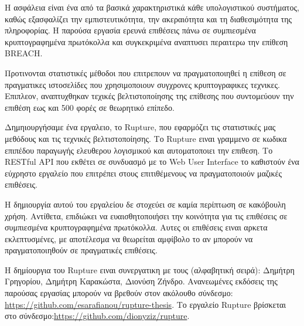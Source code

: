 \begin{abstractgr}

Η ασφάλεια είναι ένα από τα βασικά χαρακτηριστικά κάθε υπολογιστικού
συστήματος, καθώς εξασφαλίζει την εμπιστευτικότητα, την ακεραιότητα και τη διαθεσιμότητα
της πληροφορίας. Η παρούσα εργασία ερευνά επιθέσεις πάνω σε συμπιεσμένα
κρυπτογραφημένα πρωτόκολλα και συγκεκριμένα αναπτυσει περαιτερω την επίθεση BREACH.

Προτινονται στατιστικές μέθοδοι που επιτρεπουν να πραγματοποιηθεί
η επίθεση σε πραγματικες ιστοσελίδες που χρησιμοποιουν συγχρονες κρυπτογραφικες
τεχνικες. Επιπλεον, αναπτυχθηκαν τεχικές βελτιστοποίησης της επίθεσης που συντομεύουν
την επιθέση εως και 500 φορές σε θεωρητικό επίπεδο.

Δημηιουργήσαμε ένα εργαλειο, το Rupture, που εφαρμόζει τις στατιστικές μας μεθόδους και
τις τεχνικές βελτιστοποίησης. Το Rupture ειναι γραμμενο σε κωδικα επιπέδου παραγωγής 
ελευθερου λογισμικού και αυτοματοποιει την επιθεση. 
Το RESTful API που εκθέτει σε συνδυασμό με το Web User Interface το καθιστούν
ένα εύχρηστο εργαλείο που επιτρέπει στους επιτιθέμενους να πραγματοποιούν μαζικές 
επιθέσεις.

Η δημιουργία αυτού του εργαλείου δε στοχεύει σε καμία περίπτωση σε κακόβουλη χρήση.
Αντίθετα, επιδιώκει να ευαισθητοποιήσει την κοινότητα για τις επιθέσεις σε συμπιεσμένα
κρυπτογραφημένα πρωτόκολλα. Αυτες οι επιθέσεις ειναι αρκετα εκλεπτυσμένες, με αποτέλεσμα
να θεωρείται αμφίβολο το αν μπορούν να πραγματοποιηθούν σε πραγματικές επιθέσεις. 

Η δημίουργια του Rupture ειναι συνεργατικη με τους (αλφαβητική σειρά): Δημήτρη Γρηγορίου, 
Δημήτρη Καρακώστα, Διονύση Ζήνδρο.
Ανανεωμένες εκδόσεις της παρούσας εργασίας μπορούν να βρεθούν στον ακόλουθο
σύνδεσμο: \url{https://github.com/esarafianou/rupture-thesis}. Το εργαλείο
Rupture βρίσκεται στο σύνδεσμο:\url{https://github.com/dionyziz/rupture}.

\end{abstractgr}

